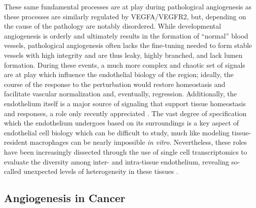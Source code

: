 These same fundamental processes are at play during pathological angiogenesis as these processes are similarly regulated by VEGFA/VEGFR2, but, depending on the cause of the pathology are notably disordered. While developmental angiogenesis is orderly and ultimately results in the formation of ``normal'' blood vessels, pathological angiogenesis often lacks the fine\hyp{}tuning needed to form stable vessels with high integrity and are thus leaky, highly branched, and lack lumen formation. During these events, a much more complex and chaotic set of signals are at play which influence the endothelial biology of the region; ideally, the course of the response to the perturbation would restore homeostasis and facilitate vascular normalization and, eventually, regression. Additionally, the endothelium itself is a major source of signaling that support tissue homeostasis and responses, a role only recently appreciated \citep{Amersfoort2022}. The vast degree of specification which the endothelium undergoes based on its surroundings is a key aspect of endothelial cell biology which can be difficult to study, much like modeling tissue\hyp{}resident macrophages can be nearly impossible \textit{in vitro}. Nevertheless, these roles have been increasingly dissected through the use of single cell transcriptomics to evaluate the diversity among inter- and intra-tissue endothelium, revealing so-called unexpected levels of heterogeneity in these tissues \citep{Chavkin2020}.

\subsection{Angiogenesis in Cancer}\label{cancerang}

